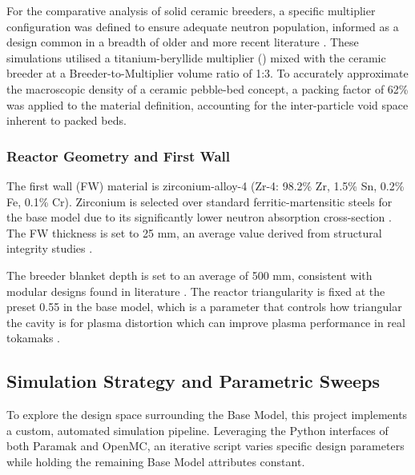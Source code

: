 \documentclass[12pt]{article}
\begin{document}
For the comparative analysis of solid ceramic breeders, a specific multiplier configuration was
defined to ensure adequate neutron population, informed as a design common in a breadth of older and
more recent literature \cite{shatalov_breeder_1991,wang_current_2019,knitter_recent_2013}. These
simulations utilised a titanium-beryllide multiplier () mixed with the ceramic breeder at
a Breeder-to-Multiplier volume ratio of 1:3. To accurately approximate the macroscopic density of a
ceramic pebble-bed concept, a packing factor of 62\% was applied to the material definition,
accounting for the inter-particle void space inherent to packed beds.

\subsubsection{Reactor Geometry and First Wall}
\label{sec:base_geometry}

The first wall (FW) material is zirconium-alloy-4 (Zr-4: 98.2\% Zr, 1.5\% Sn, 0.2\% Fe, 0.1\% Cr).
Zirconium is selected over standard ferritic-martensitic steels for the base model due to its
significantly lower neutron absorption cross-section \cite{king_high_2022}. The FW thickness is set
to 25 mm, an average value derived from structural integrity studies \cite{boullon_molten_2021,
lei_design_2020}.

The breeder blanket depth is set to an average of 500 mm, consistent with modular designs found in
literature \cite{lei_design_2020, liu_design_2022}. The reactor triangularity is fixed at the preset
0.55 in the base model, which is a parameter that controls how triangular the cavity is for plasma
distortion which can improve plasma performance in real tokamaks \cite{wesson}.

\subsection{Simulation Strategy and Parametric Sweeps}

To explore the design space surrounding the Base Model, this project implements a custom, automated
simulation pipeline. Leveraging the Python interfaces of both Paramak and OpenMC,
an iterative script varies specific design parameters while holding the remaining Base Model
attributes constant.
\end{document}
